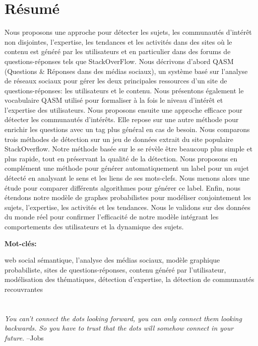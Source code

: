 \documentclass[a4paper,11pt,twoside]{ThesisStyle}
\begin{document}
\section*{R\'esum\'e}
Nous proposons une approche pour d\'etecter les sujets, les communaut\'es d'int\'er\^et non disjointes, l'expertise, les tendances et les activit\'es dans des sites o\`u le contenu est g\'en\'er\'e par les utilisateurs et en particulier dans des forums de questions-r\'eponses tels que StackOverFlow. Nous d\'ecrivons d'abord QASM (Questions \& R\'eponses dans des m\'edias sociaux), un syst\`eme bas\'e sur l'analyse de r\'eseaux sociaux pour g\'erer les deux principales ressources d’un site de questions-r\'eponses: les utilisateurs et le contenu. Nous pr\'esentons \'egalement le vocabulaire QASM utilis\'e pour formaliser \`a la fois le niveau d'int\'er\^et et l'expertise des utilisateurs. Nous proposons ensuite une approche efficace pour d\'etecter les communaut\'es d'int\'er\^ets. Elle repose sur une autre m\'ethode pour enrichir les questions avec un tag plus g\'en\'eral en cas de besoin. Nous comparons trois m\'ethodes de d\'etection sur un jeu de donn\'ees extrait du site populaire StackOverflow. Notre m\'ethode bas\'ee sur le se r\'ev\`ele \^etre beaucoup plus simple et plus rapide, tout en pr\'eservant la qualit\'e de la d\'etection. Nous proposons en compl\'ement une m\'ethode pour g\'en\'erer automatiquement un label pour un sujet d\'etect\'e en analysant le sens et les liens de ses mots-clefs. Nous menons alors une \'etude pour comparer diff\'erents algorithmes pour g\'en\'erer ce label. Enfin, nous \'etendons notre mod\`ele de graphes probabilistes pour mod\'eliser conjointement les sujets, l'expertise, les activit\'es et les tendances. Nous le validons sur des donn\'ees du monde r\'eel pour confirmer l'efficacit\'e de notre mod\`ele int\'egrant les comportements des utilisateurs et la dynamique des sujets.

\textbf{Mot-cl\'es:}

web social s\'emantique,
l'analyse des m\'edias sociaux,
mod\`ele graphique probabiliste,
sites de questions-r\'eponses, 
contenu g\'en\'er\'e par l'utilisateur,
mod\'elisation des th\'ematiques,
d\'etection d'expertise,
la d\'etection de communaut\'es recouvrantes


 
\cleardoublepage
\section*{}
\begin{vcenterpage}
\textit{You can't connect the dots looking forward, you can only connect them looking backwards. So you have to trust that the dots will somehow connect in your future.}  --Jobs
\end{vcenterpage}
\end{document}
